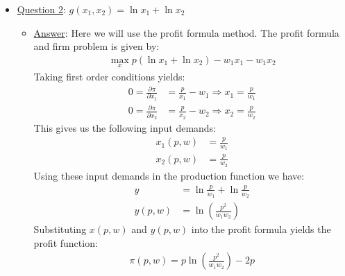 \documentclass{article}
\begin{document}
  \begin{itemize}
    \item  \underline{Question 2}: $g(x_{1},x_{2}) = \ln x_{1} + \ln x_{2}$
    \begin{itemize}
      \item  \underline{Answer}: Here we will use the profit formula method. The profit formula and firm problem is given by:
      \begin{gather*}
        \max_{x} p(\ln x_{1} + \ln x_{2}) - w_{1}x_{1} - w_{1}x_{2}
      \end{gather*}
      Taking first order conditions yields:
      \begin{align*}
        0 = \frac{\partial \pi}{\partial x_{1}} &= \frac{p}{x_{1}} - w_{1} \Rightarrow x_{1} = \frac{p}{w_{1}} \\
        0 = \frac{\partial \pi}{\partial x_{2}} &= \frac{p}{x_{2}} - w_{2} \Rightarrow x_{2} = \frac{p}{w_{2}}
      \end{align*}
      This gives us the following input demands:
      \begin{align*}
        x_{1}(p,w) &= \frac{p}{w_{1}} \\
        x_{2}(p,w) &= \frac{p}{w_{2}}
      \end{align*}
      Using these input demands in the production function we have:
      \begin{align*}
        y &= \ln \frac{p}{w_{1}} + \ln \frac{p}{w_{2}} \\
        y(p,w) &= \ln (\frac{p^{2}}{w_{1}w_{2}})
      \end{align*}
      Substituting $x(p,w)$ and $y(p,w)$ into the profit formula yields the profit function:
      \begin{gather*}
        \pi(p,w) = p \ln (\frac{p^{2}}{w_{1}w_{2}}) - 2p
      \end{gather*}
    \end{itemize}
  \end{itemize}
\par
\end{document}
